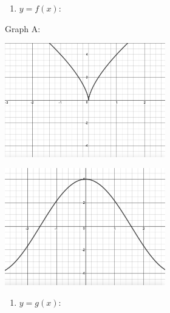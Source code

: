 \documentclass{ximera}
\begin{document}
\begin{center}


\begin{multicols}{2}

\begin{enumerate}
\setcounter{enumi}{\value{HW}}

\item \label{MatchFcnDerivative2first} $y = f(x)$:

\setcounter{HW}{\value{enumi}}
\end{enumerate}

Graph A:

\end{multicols}




\begin{multicols}{2}

\includegraphics[width=2.75in]{./IntroductiontoDerivativesGraphics/MatchFunc04.jpeg}

\includegraphics[width=2.75in]{./IntroductiontoDerivativesGraphics/MatchDeriv06.jpeg}

\end{multicols}



\begin{multicols}{2}

\begin{enumerate}
\setcounter{enumi}{\value{HW}}

\item $y = g(x)$:


\end{enumerate}
\end{multicols}
\end{center}
\end{document}

